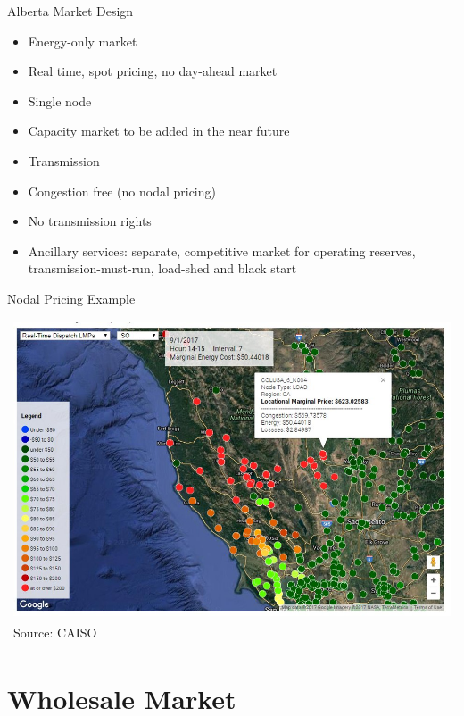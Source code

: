 \documentclass{beamer}
\renewcommand{\(}{\begin{columns}}
\renewcommand{\)}{\end{columns}}
\newcommand{\<}[1]{\begin{column}{#1}}
\renewcommand{\>}{\end{column}}
\begin{document}
\begin{frame}{Alberta Market Design}
\begin{itemize}
\setlength\itemsep{.25em}
\item Energy-only market
\item Real time, spot pricing, no day-ahead market
\item Single node
\item Capacity market to be added in the near future
\item Transmission
\item Congestion free (no nodal pricing)
\item No transmission rights
\item Ancillary services: separate, competitive market for operating reserves, transmission-must-run, load-shed and black start
\end{itemize}

\vfill
\end{frame}


\begin{frame}{Nodal Pricing Example}

\begin{tabular}{p{\linewidth}}
    \centering
    \includegraphics[width=\linewidth]{../images/cali_nodes.png} \\[.1\abovecaptionskip]
  Source: CAISO
\end{tabular}
\vfill
\end{frame}

\section{Wholesale Market}
\end{document}

